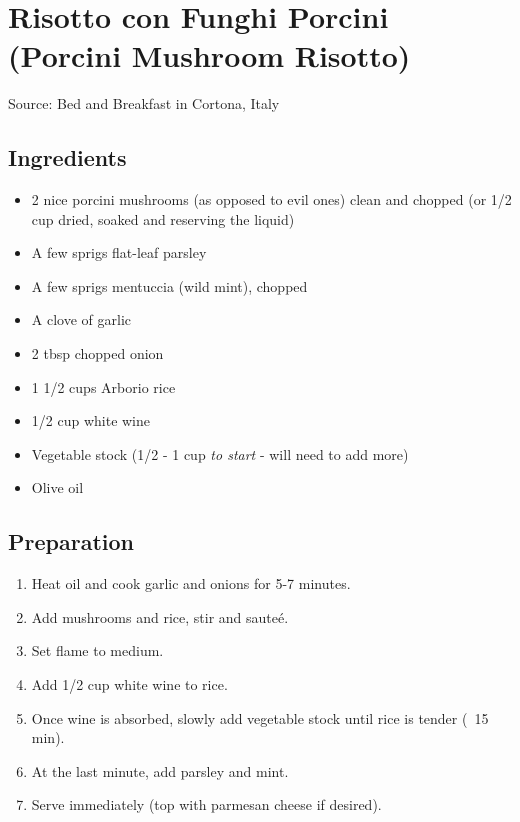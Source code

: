 \section{Risotto con Funghi Porcini (Porcini Mushroom Risotto)}

\begin{center}
Source: Bed and Breakfast in Cortona, Italy
\end{center}

\subsection{Ingredients}
\begin{itemize}
    \item 2 nice porcini mushrooms (as opposed to evil ones) clean and chopped
         (or 1/2 cup dried, soaked and reserving the liquid)
    \item A few sprigs flat-leaf parsley
    \item A few sprigs mentuccia (wild mint), chopped
    \item A clove of garlic
    \item 2 tbsp chopped onion
    \item 1 1/2 cups Arborio rice
    \item 1/2 cup white wine
    \item Vegetable stock (1/2 - 1 cup \emph{to start} - will need to add more)
    \item Olive oil
\end{itemize}

\subsection{Preparation}
\begin{enumerate}
    \item Heat oil and cook garlic and onions for 5-7 minutes.
    \item Add mushrooms and rice, stir and saute\'{e}.
    \item Set flame to medium.
    \item Add 1/2 cup white wine to rice.
    \item Once wine is absorbed, slowly add vegetable stock until rice is tender (~15 min).
    \item At the last minute, add parsley and mint.
    \item Serve immediately (top with parmesan cheese if desired).
\end{enumerate}
